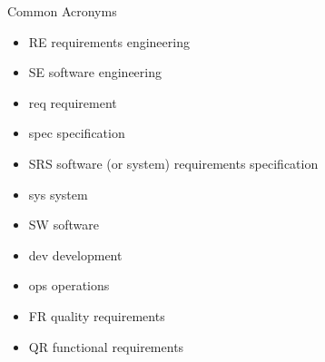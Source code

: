 
\begin{Slide}{Common Acronyms}

\begin{itemize}
\item RE   \hfill requirements engineering
\item SE   \hfill software engineering
\item req  \hfill requirement 
\item spec \hfill specification
\item SRS  \hfill software (or system) requirements specification
\item sys  \hfill system
\item SW   \hfill software
\item dev  \hfill development
\item ops  \hfill operations
\item FR   \hfill quality requirements
\item QR   \hfill functional requirements



\end{itemize}
\end{Slide}
